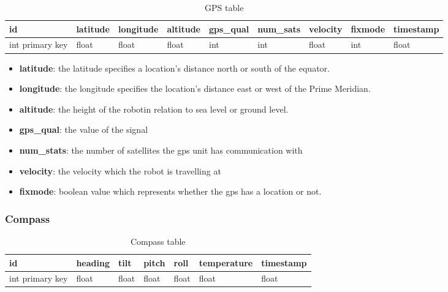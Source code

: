 \begin{table}[!htb]
\centering
\caption{GPS table}
\label{tab:db-gps}
\begin{tabular}{@{}lllllllll@{}}
\toprule
id              & latitude & longitude & altitude & gps\_qual & num\_sats & velocity & fixmode & timestamp \\ \midrule
int primary key & float    & float     & float    & int       & int       & float    & int     & float
\end{tabular}
\end{table}
\begin{itemize}
\item{\textbf{latitude}}: the latitude specifies a location's distance north or south of the equator.
\item{\textbf{longitude}}: the longitude specifies the location's distance east or west of the Prime Meridian.
\item{\textbf{altitude}}: the height of the robotin relation to sea level or ground level.
\item{\textbf{gps\_qual}}: the value of the signal
\item{\textbf{num\_stats}}: the number of satellites the gps unit has communication with
\item{\textbf{velocity}}: the velocity which the robot is travelling at
\item{\textbf{fixmode}}: boolean value which represents whether the gps has a location or not.  
\end{itemize}


\subsubsection{Compass}
\begin{table}[!htb]
\centering
\caption{Compass table}
\label{tab:db-compass}
\begin{tabular}{@{}lllllll@{}}
\toprule
id              & heading & tilt  & pitch & roll  & temperature & timestamp \\ \midrule
int primary key & float   & float & float & float & float       & float
\end{tabular}
\end{table}

